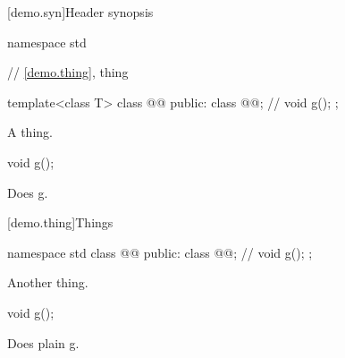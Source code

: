[demo.syn]{Header  synopsis}

\begin{codeblock}
namespace std {
  // \ref{demo.thing}, thing

  template<class T>
  class @@ {
  public:
    class @@; // \expos
    void g();
  };
}
\end{codeblock}

\pnum
\remarks
A thing.

%
\begin{itemdecl}
void g();
\end{itemdecl}

\begin{itemdescr}
\pnum
\effects
Does g.
\end{itemdescr}

[demo.thing]{Things}

\begin{codeblock}
namespace std {
  class @@ {
  public:
    class @@; // \expos
    void g();
  };
}
\end{codeblock}

\pnum
\remarks
Another thing.

%
\begin{itemdecl}
void g();
\end{itemdecl}

\begin{itemdescr}
\pnum
\effects
Does plain g.
\end{itemdescr}

